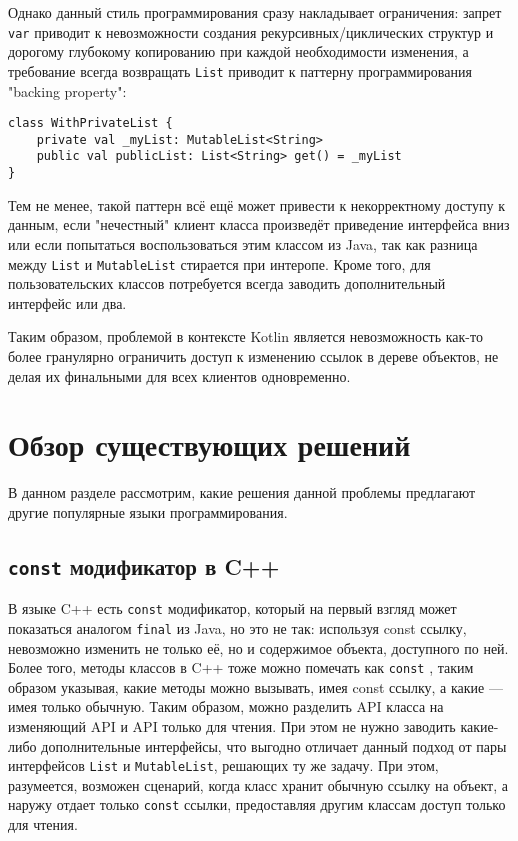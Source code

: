 \documentclass[specification,annotation,times]{itmo-student-thesis}
\begin{document}
Однако данный стиль программирования сразу накладывает ограничения: запрет \texttt{var} приводит к невозможности создания рекурсивных/циклических структур и дорогому глубокому копированию при каждой необходимости изменения, а требование всегда возвращать \texttt{List} приводит к паттерну программирования "backing property":

\begin{lstlisting}[float=h!,caption={Backing property},label={backing_property}]
class WithPrivateList {
	private val _myList: MutableList<String>
	public val publicList: List<String> get() = _myList
}
\end{lstlisting}

Тем не менее, такой паттерн всё ещё может привести к некорректному доступу к данным, если "нечестный" клиент класса произведёт приведение интерфейса вниз или если попытаться воспользоваться этим классом из Java, так как разница между \texttt{List} и \texttt{MutableList} стирается при интеропе.
Кроме того, для пользовательских классов потребуется всегда заводить дополнительный интерфейс или два.

Таким образом, проблемой в контексте Kotlin является невозможность как-то более гранулярно ограничить доступ к изменению ссылок в дереве объектов, не 
делая их финальными для всех клиентов одновременно.

\section{Обзор существующих решений}
\startrelatedwork

В данном разделе рассмотрим, какие решения данной проблемы предлагают другие популярные языки программирования.

\subsection{\texttt{const} модификатор в C++}

В языке C++ есть \texttt{const} модификатор, который на первый взгляд может показаться аналогом \texttt{final} из Java, но это не так: используя const ссылку, невозможно изменить не только её, но и содержимое объекта, доступного по ней. Более того, методы классов в C++ тоже можно помечать как \texttt{const} \cite{cpp-const}, таким образом указывая, какие методы можно вызывать, имея const ссылку, а какие --- имея только обычную.
Таким образом, можно разделить API класса на изменяющий API и API только для чтения. При этом не нужно заводить какие-либо дополнительные интерфейсы, что выгодно отличает данный подход от пары интерфейсов \texttt{List} и \texttt{MutableList}, решающих ту же задачу.
При этом, разумеется, возможен сценарий, когда класс хранит обычную ссылку на объект, а наружу отдает только \texttt{const} ссылки, предоставляя другим классам доступ только для чтения.
\end{document}

